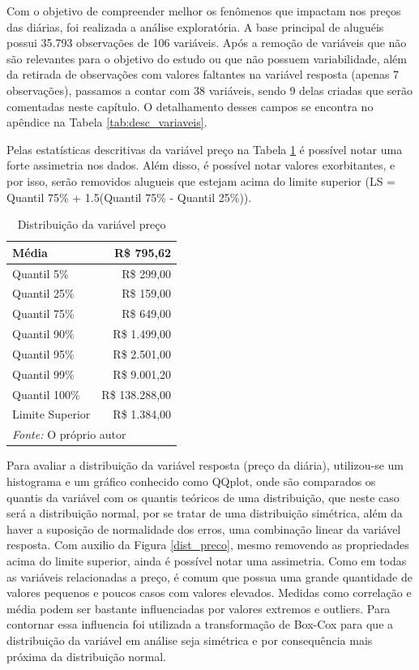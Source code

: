\documentclass[
	12pt,				%
	a4paper,		%
	oneside,    %
	chapter=TITLE,		   %
	section=TITLE,		   %
	subsection=TITLE,	   %
	subsubsection=TITLE, %
	english,			%
	french,				%
	spanish,			%
	brazil,				%
]{abntex2}
\begin{document}
Com o objetivo de compreender melhor os fenômenos que impactam nos
preços das diárias, foi realizada a análise exploratória. A base
principal de aluguéis possui 35.793 observações de 106 variáveis. Após a
remoção de variáveis que não são relevantes para o objetivo do estudo ou
que não possuem variabilidade, além da retirada de observações com
valores faltantes na variável resposta (apenas 7 observações), passamos
a contar com 38 variáveis, sendo 9 delas criadas que serão comentadas
neste capítulo. O detalhamento desses campos se encontra no apêndice na
Tabela \ref{tab:desc_variaveis}.

Pelas estatísticas descritivas da variável preço na Tabela
\ref{tab:preco_com_outlier} é possível notar uma forte assimetria nos
dados. Além disso, é possível notar valores exorbitantes, e por isso,
serão removidos alugueis que estejam acima do limite superior (LS =
Quantil 75\% + 1.5(Quantil 75\% - Quantil 25\%)).

\begin{table}

\caption{\label{tab:preco_com_outlier}Distribuição da variável preço}
\centering
\begin{tabular}[t]{l|r}
\hline
Média & R\$     795,62\\
\hline
Quantil 5\% & R\$     299,00\\
\hline
Quantil 25\% & R\$     159,00\\
\hline
Quantil 75\% & R\$     649,00\\
\hline
Quantil 90\% & R\$   1.499,00\\
\hline
Quantil 95\% & R\$   2.501,00\\
\hline
Quantil 99\% & R\$   9.001,20\\
\hline
Quantil 100\% & R\$ 138.288,00\\
\hline
Limite Superior & R\$   1.384,00\\
\hline
\multicolumn{2}{l}{\textit{Fonte: } O próprio autor}\\
\end{tabular}
\end{table}

Para avaliar a distribuição da variável resposta (preço da diária),
utilizou-se um histograma e um gráfico conhecido como QQplot, onde são
comparados os quantis da variável com os quantis teóricos de uma
distribuição, que neste caso será a distribuição normal, por se tratar
de uma distribuição simétrica, além da haver a suposição de normalidade
dos erros, uma combinação linear da variável resposta. Com auxilio da
Figura \ref{dist_preco}, mesmo removendo as propriedades acima do limite
superior, ainda é possível notar uma assimetria. Como em todas as
variáveis relacionadas a preço, é comum que possua uma grande quantidade
de valores pequenos e poucos casos com valores elevados. Medidas como
correlação e média podem ser bastante influenciadas por valores extremos
e outliers. Para contornar essa influencia foi utilizada a transformação
de Box-Cox para que a distribuição da variável em análise seja simétrica
e por consequência mais próxima da distribuição normal.
\end{document}
